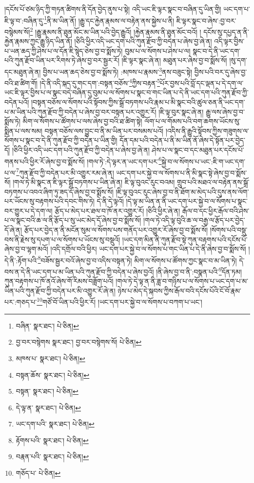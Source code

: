 །དངོས་པོ་ཙམ་ཉིད་ཀྱི་གཏན་ཚིགས་ནི་དོན་བྱེད་ནུས་པ་སྟེ། འདི་ཡང་ཇི་ལྟར་སྣང་བ་བཞིན་དུ་ཡིན་གྱི། ཡང་དག་པ་ཇི་ལྟ་བ་:བཞིན་དུ་\footnote{བཞིན་  སྣར་ཐང་།  པེ་ཅིན། }ནི་མ་ཡིན་ནོ། །རྒྱུ་དང་རྐྱེན་རྣམས་ལ་བརྟེན་ནས་སྐྱེས་པ་ནི། ཇི་ལྟར་སྣང་བ་ཞེས་:བྱ་བར་བསྙེམས་སོ།\footnote{བྱ་བར་བསྙེགས  སྣར་ཐང་། བྱ་བར་བསྙེགས་སོ།  པེ་ཅིན། } །རྒྱུ་རྣམས་ནི་ཐུན་མོང་མ་ཡིན་པའི་བྱེད་རྒྱུའོ། །རྐྱེན་རྣམས་ནི་ཐུན་མོང་བའོ། །
དངོས་སུ་དཔྱད་ན་ནི་རྐྱེན་རྣམས་ཀྱང་རྒྱུ་ཉིད་ཡིན་ནོ། །ཅིའི་ཕྱིར་འདི་ཡང་དག་པའི་ཀུན་རྫོབ་ཀྱི་བདེན་པ་ཞེས་བྱ་ཞེ་ན། འདི་ལྟར་བྱིས་པ་ཡན་ཆད་ཀྱི་ཤེས་པ་ལ་དོན་ཇི་སྙེད་ཅེས་བྱ་བ་སྨོས་ཏེ། བུམ་པ་ལ་སོགས་པ་ཤེས་པ་ལ། སྣང་བ་དེ་ནི་ཡང་དག་པའི་ཀུན་རྫོབ་ཡིན་པར་རིགས་ཏེ་ཞེས་བྱ་བར་སྦྱར་རོ། །ཇི་ལྟར་སྣང་ཞེ་ན། མཐུན་པར་ཞེས་བྱ་བ་སྨོས་སོ། །སུ་དག་དང་མཐུན་ཞེ་ན། བྱིས་པ་ཡན་ཆད་ཅེས་བྱ་བ་སྨོས་ཏེ། :མཁས་པ་རྣམས་\footnote{མཁས་པ་  སྣར་ཐང་།  པེ་ཅིན། }ནས་བཟུང་སྟེ། བྱིས་པའི་བར་དུ་ཞེས་བྱ་བའི་ཐ་ཚིག་གོ། །དེ་ནི་འདི་སྐད་དུ་གང་དག་:བསྟན་བཅོས་\footnote{བསྟན་ཆོས་  སྣར་ཐང་།  པེ་ཅིན། }ཀྱིས་བརྟན་\footnote{བསྟན་  སྣར་ཐང་།  པེ་ཅིན། }པོར་བྱས་པའི་བློ་དང་ལྡན་པ་དེ་དག་ལ་ཡང་ཇི་ལྟར་བྱིས་པ་ལ་སྣང་བདེ་བཞིན་དུ་བུམ་པ་ལ་སོགས་པ་སྣང་བ་གང་ཡིན་པ་དེ་ནི་ཡང་དག་པའི་ཀུན་རྫོབ་ཀྱི་བདེན་པའོ། །བསྟན་བཅོས་ལ་སོགས་པའི་སྟོབས་ཀྱིས་སྒྲོ་བཏགས་པའི་རྣམ་པ་མི་སྣང་བའི་ཚུལ་ཅན་ནི་ཡང་དག་པ་མ་ཡིན་པའི་ཀུན་རྫོབ་ཀྱི་བདེན་པ་ཞེས་བྱ་བར་བསྟན་པར་འགྱུར་རོ། །ཇི་ལྟ་བུར་སྣང་ཞེ་ན། རྒྱུ་ལས་ཞེས་བྱ་བ་སྨོས་ཏེ། མིག་ལ་སོགས་པ་ཚོགས་པ་ལས་ཞེས་བྱ་བའི་ཐ་ཚིག་སྟེ། ལོག་པ་ལ་གོམས་པའི་བག་ཆགས་ཡོངས་སུ་སྨིན་པ་ལས་སམ། བསྟན་བཅོས་ལས་བྱུང་བ་ནི་མ་ཡིན་པར་བསམས་པའོ། །འདིས་ནི་རྒྱུའི་སྟོབས་ཀྱིས་གཟུགས་ལ་སོགས་པ་སྣང་བ་དེ་ནི་ཀུན་རྫོབ་ཀྱི་བདེན་པ་ཡིན་གྱི། དོན་དམ་པའི་བདེན་པ་ནི་མ་ཡིན་ནོ་ཞེས་དེ་སྟོན་པར་བྱེད་དོ། །ཅིའི་ཕྱིར་འདི་ཡང་དག་པའི་ཀུན་རྫོབ་ཀྱི་བདེན་པ་ཞེས་བྱ་ཞེ་ན། ཤེས་པ་ལ་སྣང་བ་དང་མཐུན་པར་དངོས་པོ་གནས་པའི་ཕྱིར་རོ་ཞེས་བྱ་བ་སྨོས་སོ། །གལ་ཏེ་:དེ་ལྟར་ན་ཡང་དག་པར་\footnote{དེ་ལྟ་ན་  སྣར་ཐང་།  པེ་ཅིན། }སྐྱེ་བ་ལ་སོགས་པ་ཡང་:ཇི་ག་ཡང་དག་པ་ལ་\footnote{ཡང་དག་པའི་  སྣར་ཐང་།  པེ་ཅིན། }ཀུན་རྫོབ་ཀྱི་བདེན་པར་མི་འགྱུར་རམ་ཞེ་ན། ཡང་དག་པར་སྐྱེ་བ་ལ་སོགས་པ་ནི་མི་སྣང་སྟེ་ཞེས་བྱ་བ་སྨོས་སོ། །གལ་ཏེ་མི་སྣང་ན་ཇི་ལྟར་སྒྲོ་བཏགས་པ་ཡིན་ཞེ་ན། ཇི་ལྟ་བུའང་རུང་བའམ། གྲུབ་པའི་མཐའ་ལ་བརྟེན་ནས་སྒྲོ་བཏགས་པ་འབའ་ཞིག་ཏུ་ཟད་དོ་ཞེས་བྱ་བ་སྨོས་སོ། །ཇི་ལྟ་བུའང་རུང་ཞེས་བྱ་བ་ནི་ཐོག་མ་མེད་པའི་དུས་ནས་ལོག་པར་ཡོངས་སུ་བརྟགས་པའི་དབང་གིས་ཏེ། དེ་ནི་དེ་ལྟའོ། །དེ་ལྟ་མ་ཡིན་ན་ནི་ཡང་དག་པར་སྐྱེ་བ་ལ་སོགས་པ་སྣང་བར་གྱུར་པ་དེ་དག་ལ། རྩོད་པ་མེད་པར་ཐལ་བ་ཁོ་ནར་འགྱུར་རོ། །ཅིའི་ཕྱིར་ཞེ་ན། རྒོལ་བ་དང་ཕྱིར་རྒོལ་བའི་ཤེས་པ་ལ་སྣང་བའི་ཆ་ལ་ནི་རྩོད་པ་སུ་ཡང་མེད་དོ་ཞེས་བྱ་བ་སྨོས་སོ། །གལ་ཏེ་འདི་ལྟ་བུའི་ཆ་ལ་བརྒྱ་ལ་རྩོད་པར་བྱེད་དོ་ཞེ་ན། རྩོད་པར་བྱེད་ན་ནི་མངོན་སུམ་ལ་སོགས་པས་གནོད་པར་འགྱུར་རོ་ཞེས་བྱ་བ་སྨོས་སོ། །སོགས་པའི་བསྡུ་བས་ནི་རྗེས་སུ་དཔག་པ་ལ་སོགས་པ་ཡོངས་སུ་བསྡུའོ། །ཡང་དག་མིན་ནི་ཀུན་རྫོབ་སྟེ་ཀུན་བརྟགས་པའི་དངོས་པོ་ཞེས་བྱ་བ་ལྷག་མའོ། །འདི་དགྲོལ་བའི་ཕྱིར། ཡང་དག་པར་སྐྱེ་བ་ལ་སོགས་པ་གང་ཡིན་པ་དེ་ནི་ཞེས་བྱ་བ་སྨོས་སོ། །དེ་ནི་:རྟོག་པའི་\footnote{རྟོགས་པའི་  སྣར་ཐང་།  པེ་ཅིན། }བཟོས་སྦྱར་བའོ་ཞེས་བྱ་བ་འདིས་བསྟན་ཏེ། མིག་ལ་སོགས་པ་ཚོགས་ཀྱང་སྣང་བ་མ་ཡིན་ཏེ། དེ་བས་ན་དེ་ནི་ཡང་དག་པ་མ་ཡིན་པའི་ཀུན་རྫོབ་ཀྱི་བདེན་པ་ཞེས་བྱའོ། །ནི་ཞེས་བྱ་བ་ནི་:བསྣན་པའི་\footnote{བརྣན་པའི་  སྣར་ཐང་།  པེ་ཅིན། }དོན་ཏམ། ཀུན་བརྟགས་པ་ཁོ་ནའོ་ཞེས་གོ་རིམས་བཟློག་པའོ། །གལ་ཏེ་དེ་ལྟ་ན་ནི་ཟླ་བ་གཉིས་པ་ལ་སོགས་པ་ཡང་དག་པ་མ་ཡིན་པའི་ཀུན་རྫོབ་ཀྱི་བདེན་པར་མི་འགྱུར་རོ་ཞེ་ན། ཉེས་པ་མེད་དེ་སྐབས་ཀྱིས་རྒོལ་བའི་དངོས་པོའི་ངོ་བོ་རྣམ་པར་:གཅད་པ་\footnote{གཅོད་པ་  པེ་ཅིན། }གཙོ་བོ་ཡིན་པའི་ཕྱིར་རོ། །ཡང་དག་པར་སྐྱེ་བ་ལ་སོགས་པ་བཀག་པ་ཡང་། 
